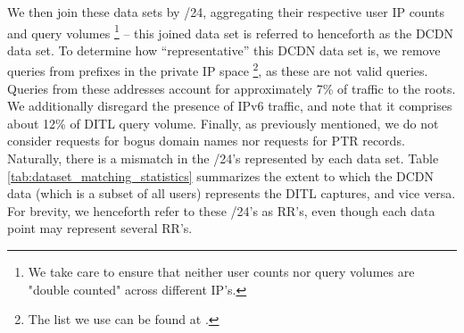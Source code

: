 \documentclass[sigconf,nonacm,10pt]{acmart}
\begin{document}
\begin{table}[]
\centering
{}
\caption{Statistics displaying the extent to which the RR's of users in a large CDN represent RR's seen in the 2018 DITL captures. Also shown is the extent to which RR's of RIPE probes represent the 2018 DITL captures.}
\label{tab:dataset_matching_statistics}
\end{table}

We then join these data sets by /24, aggregating their respective user
IP counts and query volumes
\footnote{We take care to ensure that neither user counts nor query volumes are "double counted" across different IP's.}
-- this joined data set is referred to henceforth as the DCDN data set.
To determine how ``representative'' this DCDN data set is, we remove
queries from prefixes in the private IP space
\footnote{ The list we use can be found at \cite{private_ip_space}.}, as
these are not valid queries. Queries from these addresses account for
approximately 7\% of traffic to the roots. We additionally disregard the
presence of IPv6 traffic, and note that it comprises about 12\% of DITL
query volume. Finally, as previously mentioned, we do not consider
requests for bogus domain names nor requests for PTR records. Naturally,
there is a mismatch in the /24's represented by each data set. Table
\ref{tab:dataset_matching_statistics} summarizes the extent to which the
DCDN data (which is a subset of all users) represents the DITL captures,
and vice versa. For brevity, we henceforth refer to these /24's as RR's,
even though each data point may represent several RR's.
\end{document}

